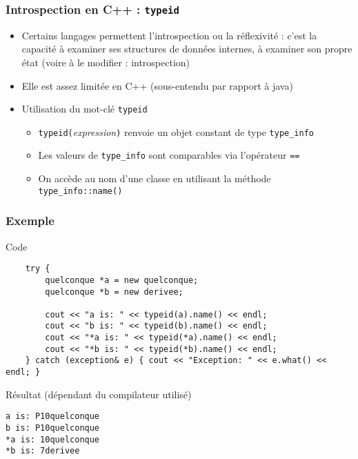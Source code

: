 \begin{frame}[fragile]\frametitle{Introspection en C++ : \texttt{typeid}}
\begin{itemize}
\item Certains langages permettent l'introspection ou la réflexivité : c'est la capacité à examiner ses structures de données internes, à examiner son propre état (voire à le modifier : introspection)
\item Elle est assez limitée en C++ (sous-entendu par rapport à java)
\item Utilisation du mot-clé \verb|typeid|
\begin{itemize}
\item \verb|typeid(|\textit{expression}\verb|)| renvoie un objet constant de type \verb|type_info|
\item Les valeurs de \verb|type_info| sont comparables via l'opérateur \verb|==|
\item On accède au nom d'une classe en utilisant la méthode \verb|type_info::name()|
\end{itemize}
\end{itemize}
\end{frame}

\begin{frame}[fragile]\frametitle{Exemple}
\begin{codeblock}{Code}
\begin{lstlisting}
    try {
        quelconque *a = new quelconque;
        quelconque *b = new derivee;

        cout << "a is: " << typeid(a).name() << endl;
        cout << "b is: " << typeid(b).name() << endl;
        cout << "*a is: " << typeid(*a).name() << endl;
        cout << "*b is: " << typeid(*b).name() << endl;
    } catch (exception& e) { cout << "Exception: " << e.what() << endl; }
\end{lstlisting}
\end{codeblock}
\begin{block}{Résultat (dépendant du compilateur utilisé)}
{\tiny
\begin{verbatim}
a is: P10quelconque
b is: P10quelconque
*a is: 10quelconque
*b is: 7derivee
\end{verbatim}
}
\end{block}
\end{frame}
